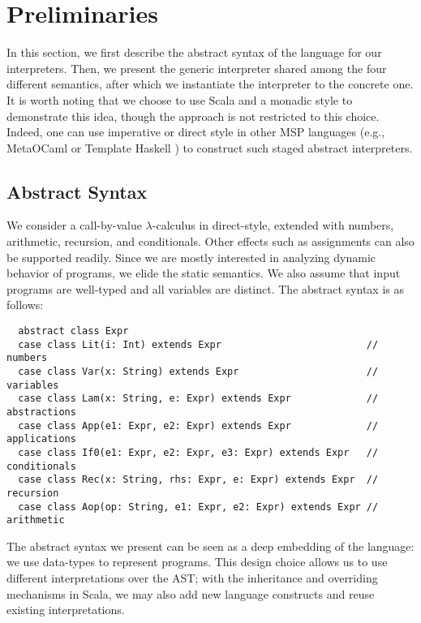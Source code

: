 \newcommand{\TLang}{$L_\lambda$}

\section{Preliminaries} \label{prelim}

In this section, we first describe the abstract syntax of the language for our
interpreters. Then, we present the generic interpreter shared among the four
different semantics, after which we instantiate the interpreter to the concrete
one. It is worth noting that we choose to use Scala and a monadic style to
demonstrate this idea, though the approach is not restricted to this choice.
Indeed, one can use imperative or direct style in other MSP languages (e.g.,
MetaOCaml \cite{DBLP:conf/gpce/CalcagnoTHL03, DBLP:conf/flops/Kiselyov14} or
Template Haskell \cite{Sheard:2002:TMH:636517.636528}) to construct such staged
abstract interpreters.

\subsection{Abstract Syntax} \label{bg_lang}

We consider a call-by-value $\lambda$-calculus in direct-style, extended with
numbers, arithmetic, recursion, and conditionals. Other effects such as
assignments can also be supported readily. Since we are mostly interested in
analyzing dynamic behavior of programs, we elide the static semantics. We also
assume that input programs are well-typed and all variables are distinct. The
abstract syntax is as follows:
\begin{lstlisting}
  abstract class Expr
  case class Lit(i: Int) extends Expr                         // numbers
  case class Var(x: String) extends Expr                      // variables
  case class Lam(x: String, e: Expr) extends Expr             // abstractions
  case class App(e1: Expr, e2: Expr) extends Expr             // applications
  case class If0(e1: Expr, e2: Expr, e3: Expr) extends Expr   // conditionals
  case class Rec(x: String, rhs: Expr, e: Expr) extends Expr  // recursion
  case class Aop(op: String, e1: Expr, e2: Expr) extends Expr // arithmetic
\end{lstlisting}

The abstract syntax we present can be seen as a deep embedding of the language:
we use data-types to represent programs. This design choice allows us to use
different interpretations over the AST; with the inheritance and overriding
mechanisms in Scala, we may also add new language constructs and reuse existing
interpretations.


